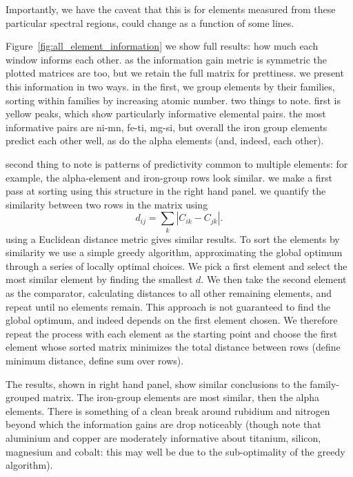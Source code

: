\documentclass[a4paper,fleqn,usenatbib]{mnras}
\begin{document}
Importantly, we have the caveat that this is for elements measured from these particular spectral regions, could change as a function of some lines.

Figure~\ref{fig:all_element_information} we show full results: how much each window informs each other. as the information gain metric is symmetric the plotted matrices are too, but we retain the full matrix for prettiness. we present this information in two ways. in the first, we group elements by their families, sorting within families by increasing atomic number. two things to note. first is yellow peaks, which show particularly informative elemental pairs. the most informative pairs are ni-mn, fe-ti, mg-si, but overall the iron group elements predict each other well, as do the alpha elements (and, indeed, each other).

second thing to note is patterns of predictivity common to multiple elements: for example, the alpha-element and iron-group rows look similar. we make a first pass at sorting using this structure in the right hand panel. we quantify the similarity between two rows in the matrix using
\begin{equation}
d_{ij} = \sum_k |C_{ik} - C_{jk}|.
\end{equation}
using a Euclidean distance metric gives similar results. To sort the elements by similarity we use a simple greedy algorithm, approximating the global optimum through a series of locally optimal choices. We pick a first element and select the most similar element by finding the smallest $d$. We then take the second element as the comparator, calculating distances to all other remaining elements, and repeat until no elements remain. This approach is not guaranteed to find the global optimum, and indeed depends on the first element chosen. We therefore repeat the process with each element as the starting point and choose the first element whose sorted matrix minimizes the total distance between rows (define minimum distance, define sum over rows).

The results, shown in right hand panel, show similar conclusions to the family-grouped matrix. The iron-group elements are most similar, then the alpha elements. There is something of a clean break around rubidium and nitrogen beyond which the information gains are drop noticeably (though note that aluminium and copper are moderately informative about titanium, silicon, magnesium and cobalt: this may well be due to the sub-optimality of the greedy algorithm).
\end{document}
